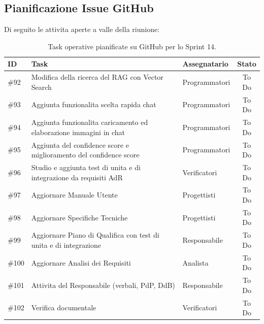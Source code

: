 \documentclass[a4paper, 11pt, oneside]{scrartcl} %
\begin{document}
\subsection{Pianificazione Issue GitHub}
Di seguito le attivita aperte a valle della riunione:

\begin{table}[h!]
\centering
\small 
\begin{tabularx}{\textwidth}{@{}l X l c@{}} 
\toprule
\textbf{ID} & \textbf{Task} & \textbf{Assegnatario} & \textbf{Stato} \\
\midrule
\#92 & Modifica della ricerca del RAG con Vector Search & Programmatori & To Do \\
\addlinespace
\#93 & Aggiunta funzionalita scelta rapida chat & Programmatori & To Do \\
\addlinespace
\#94 & Aggiunta funzionalita caricamento ed elaborazione immagini in chat & Programmatori & To Do \\
\addlinespace
\#95 & Aggiunta del confidence score e miglioramento del confidence score & Programmatori & To Do \\
\addlinespace
\#96 & Studio e aggiunta test di unita e di integrazione da requisiti AdR & Verificatori & To Do \\
\addlinespace
\#97 & Aggiornare Manuale Utente & Progettisti & To Do \\
\addlinespace
\#98 & Aggiornare Specifiche Tecniche & Progettisti & To Do \\
\addlinespace
\#99 & Aggiornare Piano di Qualifica con test di unita e di integrazione & Responsabile & To Do \\
\addlinespace
\#100 & Aggiornare Analisi dei Requisiti & Analista & To Do \\
\addlinespace
\#101 & Attivita del Responsabile (verbali, PdP, DdB) & Responsabile & To Do \\
\addlinespace
\#102 & Verifica documentale & Verificatori & To Do \\
\bottomrule
\end{tabularx}
\caption{Task operative pianificate su GitHub per lo Sprint 14.}
\end{table}

\newpage
\end{document}
